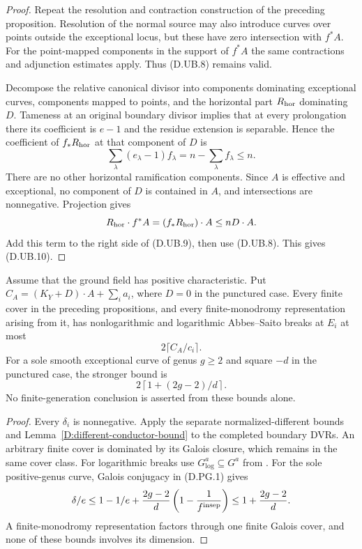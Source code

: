 \begin{proof}
Repeat the resolution and contraction construction of the
preceding proposition. Resolution of the normal source may
also introduce curves over points outside the exceptional
locus, but these have zero intersection with $f^*A$.
For the point-mapped components in the support of $f^*A$
the same contractions and adjunction estimates apply.
Thus (D.UB.8) remains valid.

Decompose the relative canonical divisor into components
dominating exceptional curves, components mapped to points,
and the horizontal part $R_{\rm hor}$ dominating $D$.
Tameness at an original boundary divisor implies that at
every prolongation there its coefficient is $e-1$ and the
residue extension is separable. Hence the coefficient of
$f_*R_{\rm hor}$ at that component of $D$ is
\[
                    \sum_\lambda(e_\lambda-1)f_\lambda
                          =n-\sum_\lambda f_\lambda\leq n.
\]
There are no other horizontal ramification components.
Since $A$ is effective and exceptional, no component of $D$
is contained in $A$, and intersections are nonnegative.
Projection gives
\[
                 R_{\rm hor}\cdot f^*A
                      =(f_*R_{\rm hor})\cdot A\leq nD\cdot A.
\]
Add this term to the right side of (D.UB.9), then use
(D.UB.8). This gives (D.UB.10).
\end{proof}

\begin{corollary}
\label{D:surface-uniform-conductor}
Assume that the ground field has positive characteristic.
Put $C_A=(K_Y+D)\cdot A+\sum_i a_i$, where $D=0$ in the
punctured case. Every finite cover in the preceding
propositions, and every finite-monodromy representation
arising from it, has nonlogarithmic and logarithmic
Abbes--Saito breaks at $E_i$ at most
\[
                         2\lceil C_A/c_i\rceil.           \tag{D.UB.11}
\]
For a sole smooth exceptional curve of genus $g\geq2$
and square $-d$ in the punctured case, the stronger
bound is
\[
                         2\left\lceil1+(2g-2)/d\right\rceil.
                                                               \tag{D.UB.12}
\]
No finite-generation conclusion is asserted from these
bounds alone.
\end{corollary}

\begin{proof}
Every $\delta_i$ is nonnegative. Apply the separate
normalized-different bounds and
Lemma~\ref{D:different-conductor-bound} to the completed
boundary DVRs. An arbitrary finite cover is dominated by
its Galois closure, which remains in the same cover class.
For logarithmic breaks use
$G^a_{\log}\subseteq G^a$ from
\cite[Proposition 3.15(1), preprint p.8]{AbbesSaito2002D}.
For the sole positive-genus curve, Galois conjugacy in
(D.PG.1) gives
\[
    \delta/e\leq1-1/e+
       \frac{2g-2}{d}\left(1-\frac1{f^{\rm insep}}\right)
                  \leq1+\frac{2g-2}{d}.
\]
A finite-monodromy representation factors through one
finite Galois cover, and none of these bounds involves
its dimension.
\end{proof}
